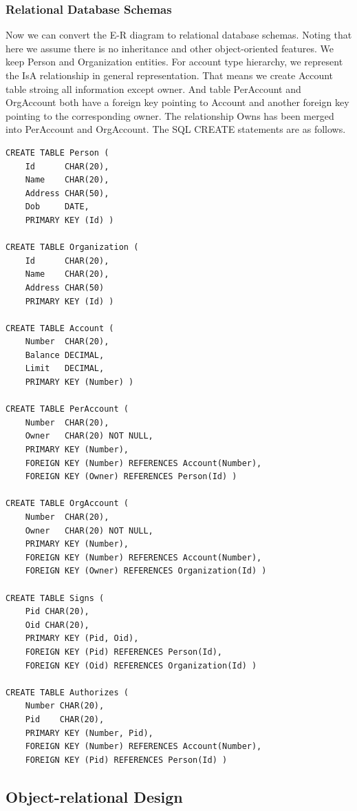 \documentclass[11pt]{article}
\begin{document}
\subsubsection{Relational Database Schemas}
\par
Now we can convert the E-R diagram to relational database schemas. Noting that here we assume there is no inheritance and other object-oriented features. We keep Person and Organization entities. For account type hierarchy, we represent the IsA relationship in general representation. That means we create Account table stroing all information except owner. And table PerAccount and OrgAccount both have a foreign key pointing to Account and another foreign key pointing to the corresponding owner. The relationship Owns has been merged into PerAccount and OrgAccount. The SQL CREATE statements are as follows.
\begin{verbatim}
CREATE TABLE Person (
    Id      CHAR(20),
    Name    CHAR(20),
    Address CHAR(50),
    Dob     DATE,
    PRIMARY KEY (Id) )

CREATE TABLE Organization (
    Id      CHAR(20),
    Name    CHAR(20),
    Address CHAR(50)
    PRIMARY KEY (Id) )

CREATE TABLE Account (
    Number  CHAR(20),
    Balance DECIMAL,
    Limit   DECIMAL,
    PRIMARY KEY (Number) )

CREATE TABLE PerAccount (
    Number  CHAR(20),
    Owner   CHAR(20) NOT NULL,
    PRIMARY KEY (Number),
    FOREIGN KEY (Number) REFERENCES Account(Number),
    FOREIGN KEY (Owner) REFERENCES Person(Id) )

CREATE TABLE OrgAccount (
    Number  CHAR(20),
    Owner   CHAR(20) NOT NULL,
    PRIMARY KEY (Number),
    FOREIGN KEY (Number) REFERENCES Account(Number),
    FOREIGN KEY (Owner) REFERENCES Organization(Id) )

CREATE TABLE Signs (
    Pid CHAR(20),
    Oid CHAR(20),
    PRIMARY KEY (Pid, Oid),
    FOREIGN KEY (Pid) REFERENCES Person(Id),
    FOREIGN KEY (Oid) REFERENCES Organization(Id) )

CREATE TABLE Authorizes (
    Number CHAR(20),
    Pid    CHAR(20),
    PRIMARY KEY (Number, Pid),
    FOREIGN KEY (Number) REFERENCES Account(Number),
    FOREIGN KEY (Pid) REFERENCES Person(Id) )
\end{verbatim}

\subsection{Object-relational Design}
\end{document}
